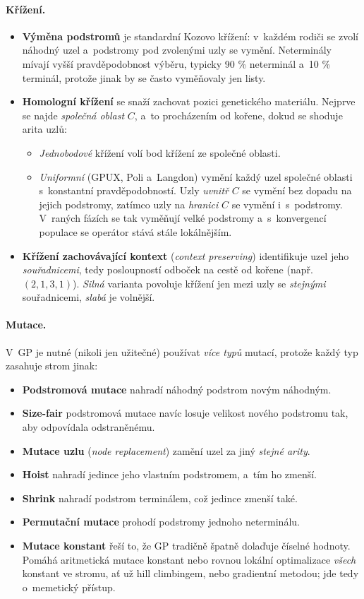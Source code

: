 \documentclass[11pt,a4paper]{article}
\theoremstyle{definition}
\begin{document}
\paragraph{Křížení.}
\begin{itemize}
\item \textbf{Výměna podstromů} je standardní Kozovo křížení: v~každém rodiči se zvolí
  náhodný uzel a~podstromy pod zvolenými uzly se vymění. Neterminály mívají vyšší pravděpodobnost
  výběru, typicky 90 \% neterminál a~10 \% terminál, protože jinak by se často
  vyměňovaly jen listy.
\item \textbf{Homologní křížení} se snaží zachovat pozici genetického materiálu.
  Nejprve se najde \emph{společná oblast} $C$, a~to procházením od kořene, dokud se
  shoduje arita uzlů:
  \begin{itemize}
  \item \emph{Jednobodové} křížení volí bod křížení ze společné oblasti.
  \item \emph{Uniformní} (GPUX, Poli a~Langdon) vymění každý uzel společné oblasti
    s~konstantní pravděpodobností. Uzly \emph{uvnitř} $C$ se vymění bez dopadu na jejich
    podstromy, zatímco uzly na \emph{hranici} $C$ se vymění i~s~podstromy. V~raných
    fázích se tak vyměňují velké podstromy a~s~konvergencí populace se operátor stává
    stále lokálnějším.
  \end{itemize}
\item \textbf{Křížení zachovávající kontext} (\emph{context preserving}) identifikuje
  uzel jeho \emph{souřadnicemi}, tedy posloupností odboček na cestě od kořene
  (např.\ $(2,1,3,1)$). \emph{Silná} varianta povoluje křížení jen mezi uzly se
  \emph{stejnými} souřadnicemi, \emph{slabá} je volnější.
\end{itemize}

\paragraph{Mutace.} V~GP je nutné (nikoli jen užitečné) používat \emph{více
typů} mutací, protože každý typ zasahuje strom jinak:
\begin{itemize}
\item \textbf{Podstromová mutace} nahradí náhodný podstrom novým náhodným.
\item \textbf{Size-fair} podstromová mutace navíc losuje velikost nového podstromu tak,
  aby odpovídala odstraněnému.
\item \textbf{Mutace uzlu} (\emph{node replacement}) zamění uzel za jiný \emph{stejné
  arity}.
\item \textbf{Hoist} nahradí jedince jeho vlastním podstromem, a~tím ho zmenší.
\item \textbf{Shrink} nahradí podstrom terminálem, což jedince zmenší také.
\item \textbf{Permutační mutace} prohodí podstromy jednoho neterminálu.
\item \textbf{Mutace konstant} řeší to, že GP tradičně špatně dolaďuje číselné hodnoty.
  Pomáhá aritmetická mutace konstant nebo rovnou lokální optimalizace \emph{všech}
  konstant ve stromu, ať už hill climbingem, nebo gradientní metodou; jde tedy
  o~memetický přístup.
\end{itemize}
\end{document}

